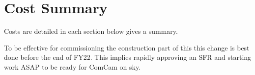\section{Cost Summary}\label{sec:cost}

Costs are detailed in each section below  gives a summary.



To be effective for commissioning the construction part of this this change is best done before the end of FY22.
This implies rapidly approving an SFR and starting work ASAP to be ready for ComCam on sky.
